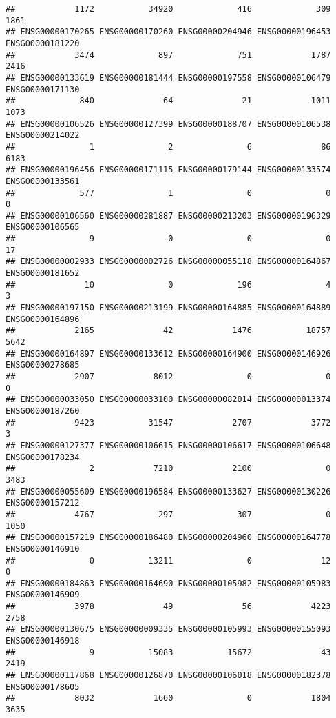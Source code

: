 \documentclass[
]{article}
\begin{document}
\begin{verbatim}
##            1172           34920             416             309            1861 
## ENSG00000170265 ENSG00000170260 ENSG00000204946 ENSG00000196453 ENSG00000181220 
##            3474             897             751            1787            2416 
## ENSG00000133619 ENSG00000181444 ENSG00000197558 ENSG00000106479 ENSG00000171130 
##             840              64              21            1011            1073 
## ENSG00000106526 ENSG00000127399 ENSG00000188707 ENSG00000106538 ENSG00000214022 
##               1               2               6              86            6183 
## ENSG00000196456 ENSG00000171115 ENSG00000179144 ENSG00000133574 ENSG00000133561 
##             577               1               0               0               0 
## ENSG00000106560 ENSG00000281887 ENSG00000213203 ENSG00000196329 ENSG00000106565 
##               9               0               0               0              17 
## ENSG00000002933 ENSG00000002726 ENSG00000055118 ENSG00000164867 ENSG00000181652 
##              10               0             196               4               3 
## ENSG00000197150 ENSG00000213199 ENSG00000164885 ENSG00000164889 ENSG00000164896 
##            2165              42            1476           18757            5642 
## ENSG00000164897 ENSG00000133612 ENSG00000164900 ENSG00000146926 ENSG00000278685 
##            2907            8012               0               0               0 
## ENSG00000033050 ENSG00000033100 ENSG00000082014 ENSG00000013374 ENSG00000187260 
##            9423           31547            2707            3772               3 
## ENSG00000127377 ENSG00000106615 ENSG00000106617 ENSG00000106648 ENSG00000178234 
##               2            7210            2100               0            3483 
## ENSG00000055609 ENSG00000196584 ENSG00000133627 ENSG00000130226 ENSG00000157212 
##            4767             297             307               0            1050 
## ENSG00000157219 ENSG00000186480 ENSG00000204960 ENSG00000164778 ENSG00000146910 
##               0           13211               0              12               0 
## ENSG00000184863 ENSG00000164690 ENSG00000105982 ENSG00000105983 ENSG00000146909 
##            3978              49              56            4223            2758 
## ENSG00000130675 ENSG00000009335 ENSG00000105993 ENSG00000155093 ENSG00000146918 
##               9           15083           15672              43            2419 
## ENSG00000117868 ENSG00000126870 ENSG00000106018 ENSG00000182378 ENSG00000178605 
##            8032            1660               0            1804            3635 

\end{verbatim}
\end{document}
